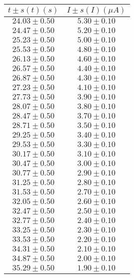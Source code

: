 \documentclass[12pt, letterpaper]{article} %
\theoremstyle{plain} %
\begin{document}
\begin{figure}[H]
\centering
\begin{minipage}[t]{0.48\textwidth}
\centering
\footnotesize
\begin{minipage}[t]{\linewidth}
\centering
\setlength{\arrayrulewidth}{1.2pt}
\begin{tabular}{|c|c|}
\hline
$t \pm s(t) (s)$ & $I \pm s(I) (\mu A)$ \\
\hline
$24.03 \pm 0.50$ & $5.30 \pm 0.10$ \\
$24.47 \pm 0.50$ & $5.20 \pm 0.10$ \\
$25.23 \pm 0.50$ & $5.00 \pm 0.10$ \\
$25.53 \pm 0.50$ & $4.80 \pm 0.10$ \\
$26.13 \pm 0.50$ & $4.60 \pm 0.10$ \\
$26.57 \pm 0.50$ & $4.40 \pm 0.10$ \\
$26.87 \pm 0.50$ & $4.30 \pm 0.10$ \\
$27.23 \pm 0.50$ & $4.10 \pm 0.10$ \\
$27.73 \pm 0.50$ & $3.90 \pm 0.10$ \\
$28.07 \pm 0.50$ & $3.80 \pm 0.10$ \\
$28.47 \pm 0.50$ & $3.70 \pm 0.10$ \\
$28.71 \pm 0.50$ & $3.50 \pm 0.10$ \\
$29.25 \pm 0.50$ & $3.40 \pm 0.10$ \\
$29.53 \pm 0.50$ & $3.30 \pm 0.10$ \\
$30.17 \pm 0.50$ & $3.10 \pm 0.10$ \\
$30.47 \pm 0.50$ & $3.00 \pm 0.10$ \\
$30.77 \pm 0.50$ & $2.90 \pm 0.10$ \\
$31.25 \pm 0.50$ & $2.80 \pm 0.10$ \\
$31.53 \pm 0.50$ & $2.70 \pm 0.10$ \\
$32.05 \pm 0.50$ & $2.60 \pm 0.10$ \\
$32.47 \pm 0.50$ & $2.50 \pm 0.10$ \\
$32.77 \pm 0.50$ & $2.40 \pm 0.10$ \\
$33.25 \pm 0.50$ & $2.30 \pm 0.10$ \\
$33.53 \pm 0.50$ & $2.20 \pm 0.10$ \\
$34.31 \pm 0.50$ & $2.10 \pm 0.10$ \\
$34.87 \pm 0.50$ & $2.00 \pm 0.10$ \\
$35.29 \pm 0.50$ & $1.90 \pm 0.10$ \\

\end{tabular}
\end{minipage}
\end{minipage}
\end{figure}
\end{document}
